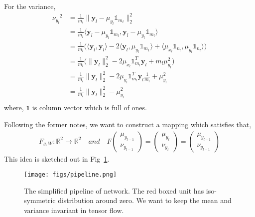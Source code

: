 \documentclass[]{article}
\begin{document}
For the variance,
\begin{align}\label{var_x}
{\nu_{y_{l}}}^{2}
& = \frac{1}{m_l}\|\mathbf{y}_{l}-\mu_{y_{l}}\mathbb{1}_{m_l}\|^2_2   \\
& = \frac{1}{m_l}\langle \mathbf{y}_{l}-\mu_{y_{l}}\mathbb{1}_{m_l}, \mathbf{y}_{l}-\mu_{y_{l}}\mathbb{1}_{m_l}\rangle   \\
& = \frac{1}{m_l}\big(\langle \mathbf{y}_{l}, \mathbf{y}_{l}\rangle-2\langle \mathbf{y}_{l}, \mu_{y_{l}}\mathbb{1}_{m_1}\rangle+\langle \mu_{x_{l}}\mathbb{1}_{n_l}, \mu_{y_{l}}\mathbb{1}_{n_l}\rangle\big)  \\
& = \frac{1}{m_l}\big(\|\mathbf{y}_{l}\|^2_2-2\mu_{x_{l}}{\mathbb{1}}^{T}_{m_l}\mathbf{y}_{l}+{m_l}\mu_{y_{l}}^2)  \\
& = \frac{1}{m_l}\|\mathbf{y}_{l}\|^2_2-2\mu_{y_{l}}{\mathbb{1}}^{T}_{m_l}\mathbf{y}_{l}\frac{1}{m_l}+\mu_{y_{l}}^2  \\
& = \frac{1}{m_l}\|\mathbf{y}_{l}\|^2_2-\mu_{y_{l}}^2  \\
\end{align}
where, $\mathbb{1}$ is column vector which is full of ones.

Following the former notes, we want to construct a mapping which satisfies that,
\begin{align}\label{mapping}
F_{g,W}: \mathbb{R}^2 \rightarrow \mathbb{R}^2  \quad and \quad  F\begin{pmatrix} \mu_{y_{l-1}}\\ \nu_{y_{l-1}} \end{pmatrix}=\begin{pmatrix} \mu_{y_{l}}\\ \nu_{y_{l}} \end{pmatrix}=\begin{pmatrix} \mu_{y_{l-1}}\\ \nu_{y_{l-1}} \end{pmatrix}
\end{align}
This idea is sketched out in Fig~\ref{pipeline}.
\begin{figure}
  \centering
  \texttt{[image: figs/pipeline.png]}\\
  \caption{The simplified pipeline of network. The red boxed unit has iso-symmetric distribution around zero. We want to keep the mean and variance invariant in tensor flow.}\label{pipeline}
\end{figure}
\end{document}
